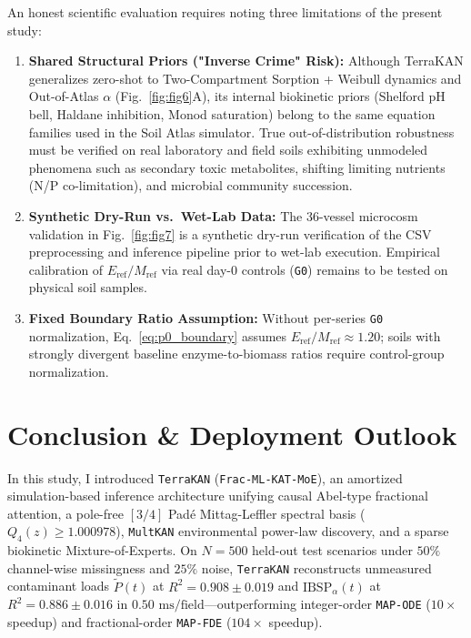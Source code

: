 \documentclass[10pt,twocolumn,a4paper]{article}
\begin{document}
An honest scientific evaluation requires noting three limitations of the present study:
\begin{enumerate}\setlength{\itemsep}{1pt}\setlength{\parskip}{0pt}
  \item \textbf{Shared Structural Priors ("Inverse Crime" Risk):} Although TerraKAN generalizes zero-shot to Two-Compartment Sorption + Weibull dynamics and Out-of-Atlas $\alpha$ (Fig.~\ref{fig:fig6}A), its internal biokinetic priors (Shelford pH bell, Haldane inhibition, Monod saturation) belong to the same equation families used in the Soil Atlas simulator. True out-of-distribution robustness must be verified on real laboratory and field soils exhibiting unmodeled phenomena such as secondary toxic metabolites, shifting limiting nutrients (N/P co-limitation), and microbial community succession.
  \item \textbf{Synthetic Dry-Run vs.\ Wet-Lab Data:} The 36-vessel microcosm validation in Fig.~\ref{fig:fig7} is a synthetic dry-run verification of the CSV preprocessing and inference pipeline prior to wet-lab execution. Empirical calibration of $E_{\text{ref}}/M_{\text{ref}}$ via real day-0 controls (\texttt{G0}) remains to be tested on physical soil samples.
  \item \textbf{Fixed Boundary Ratio Assumption:} Without per-series \texttt{G0} normalization, Eq.~\eqref{eq:p0_boundary} assumes $E_{\text{ref}}/M_{\text{ref}} \approx 1.20$; soils with strongly divergent baseline enzyme-to-biomass ratios require control-group normalization.
\end{enumerate}

\section{Conclusion \& Deployment Outlook}

In this study, I introduced \texttt{TerraKAN} (\texttt{Frac-ML-KAT-MoE}), an amortized simulation-based inference architecture unifying causal Abel-type fractional attention, a pole-free $[3/4]$ Pad\'e Mittag-Leffler spectral basis ($Q_4(z) \ge 1.000978$), \texttt{MultKAN} environmental power-law discovery, and a sparse biokinetic Mixture-of-Experts. On $N=500$ held-out test scenarios under $50\%$ channel-wise missingness and $25\%$ noise, \texttt{TerraKAN} reconstructs unmeasured contaminant loads $\tilde{P}(t)$ at $R^2 = 0.908 \pm 0.019$ and $\text{IBSP}_\alpha(t)$ at $R^2 = 0.886 \pm 0.016$ in $0.50\text{ ms/field}$---outperforming integer-order \texttt{MAP-ODE} ($10\times$ speedup) and fractional-order \texttt{MAP-FDE} ($104\times$ speedup).
\end{document}
